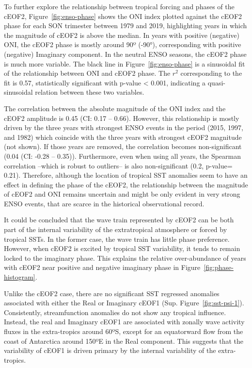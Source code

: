 \documentclass[smallextended]{svjour3}       %
\begin{document}
To further explore the relationship between tropical forcing and phases of the cEOF2, Figure~\ref{fig:enso-phase} shows the ONI index plotted against the cEOF2 phase for each SON trimester between 1979 and 2019, highlighting years in which the magnitude of cEOF2 is above the median.
In years with positive (negative) ONI, the cEOF2 phase is mostly around 90º (-90°), corresponding with positive (negative) Imaginary component.
In the neutral ENSO seasons, the cEOF2 phase is much more variable.
The black line in Figure~\ref{fig:enso-phase} is a sinusoidal fit of the relationship between ONI and cEOF2 phase.
The \(r^2\) corresponding to the fit is 0.57, statistically significant with p-value \textless{} 0.001, indicating a quasi-sinusoidal relation between these two variables.

The correlation between the absolute magnitude of the ONI index and the cEOF2 amplitude is 0.45 (CI: 0.17 -- 0.66).
However, this relationship is mostly driven by the three years with strongest ENSO events in the period (2015, 1997, and 1982) which coincide with the three years with strongest cEOF2 magnitude (not shown).
If those years are removed, the correlation becomes non-significant (0.04 (CI: -0.28 -- 0.35)).
Furthermore, even when using all years, the Spearman correlation --which is robust to outliers-- is also non-significant (0.2, p-value= 0.21).
Therefore, although the location of tropical SST anomalies seem to have an effect in defining the phase of the cEOF2, the relationship between the magnitude of cEOF2 and ONI remains uncertain and might be only evident in very strong ENSO events, that are scarce in the historical observational record.

It could be concluded that the wave train represented by cEOF2 can be both part of the internal variability of the extratropical atmosphere or forced by tropical SSTs.
In the former case, the wave train has little phase preference.
However, when cEOF2 is excited by tropical SST variability, it tends to remain locked to the imaginary phase.
This explains the relative over-abundance of years with cEOF2 near positive and negative imaginary phase in Figure~\ref{fig:phase-histogram}.

Unlike the cEOF2 case, there are no significant SST regressed anomalies associated with either the Real or Imaginary cEOF1 (Sup. Figure~\ref{fig:sst-psi-1}).
Consistently, streamfunction anomalies do not show any tropical influence.
Instead, the real and Imaginary cEOF1 are associated with zonally wave activity fluxes in the extra-tropics around 60ºS, except for an equatorward flow from the coast of Antarctica around 150ºE in the Real component.
This suggests that the variability of cEOF1 is driven primary by the internal variability of the extra-tropics.
\end{document}
